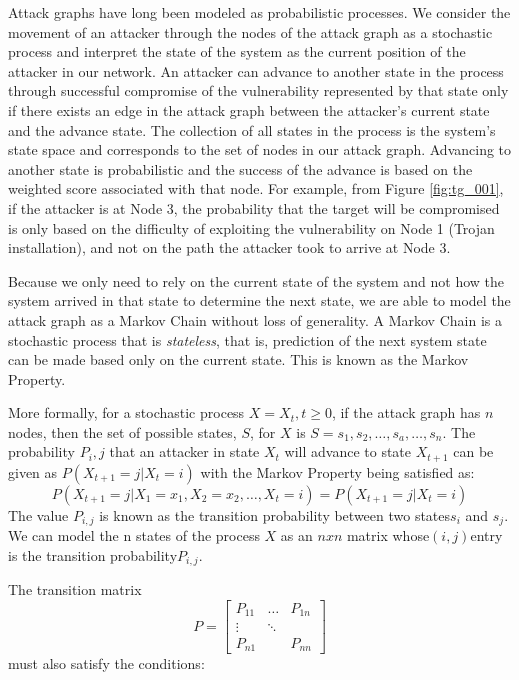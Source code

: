 Attack graphs have long been modeled as probabilistic processes\cite{Dacier_Deswarte_Kaaniche}\cite{Ortalo_1999}\cite{Abraham_Nair_2015a}. We consider the movement of an attacker through the nodes of the attack graph as a stochastic process and interpret the state of the system as the current position of the attacker in our network. An attacker can advance to another state in the process through successful compromise of the vulnerability represented by that state only if there exists an edge in the attack graph between the attacker’s current state and the advance state.  The collection of all states in the process is the system’s state space and corresponds to the set of nodes in our attack graph. Advancing to another state is probabilistic and the success of the advance is based on the weighted score associated with that node. For example, from Figure \ref{fig:tg_001}, if the attacker is at Node 3, the probability that the target will be compromised is only based on the difficulty of exploiting the vulnerability on Node 1 (Trojan installation), and not on the path the attacker took to arrive at Node 3.

Because we only need to rely on the current state of the system and not how the system arrived in that state to determine the next state, we are able to model the attack graph as a Markov Chain without loss of generality. A Markov Chain is a stochastic process that is \textit{stateless}, that is, prediction of the next system state can be made based only on the current state. This is known as the Markov Property.  

More formally, for a stochastic process \(X = {X_t, t \geq 0}\), if the attack graph has \(n\) nodes, then the set of possible states, \(S\), for \(X\) is \(S = {s_1, s_2, \ldots, s_a, \ldots, s_n}\). The probability \(P_i,j\) that an attacker in state \(X_t\) will advance to state \(X_{t+1}\) can be given as \(P(X_{t+1} = j | X_t = i)\) with the Markov Property being satisfied as: 
\[P(X_{t+1} = j | X_1 = x_1 , X_2 = x_2 , \ldots, X_t = i)  = P(X_{t+1} = j | X_t = i) \]
The value \( P_{i,j}\) is known as the transition probability between two states\( s_i\) and \(s_j\). We can model the n states of the process \(X\) as an \(nxn\) matrix whose\( (i, j) \)entry is the transition probability\( P_{i,j}\). 

 

The transition matrix
\[
P = \begin{bmatrix} 
    P_{11} & \dots & P_{1n}  \\
    \vdots & \ddots & \\
    P_{n1} &        & P_{nn} 
    \end{bmatrix}
\]
must also satisfy the conditions:  

